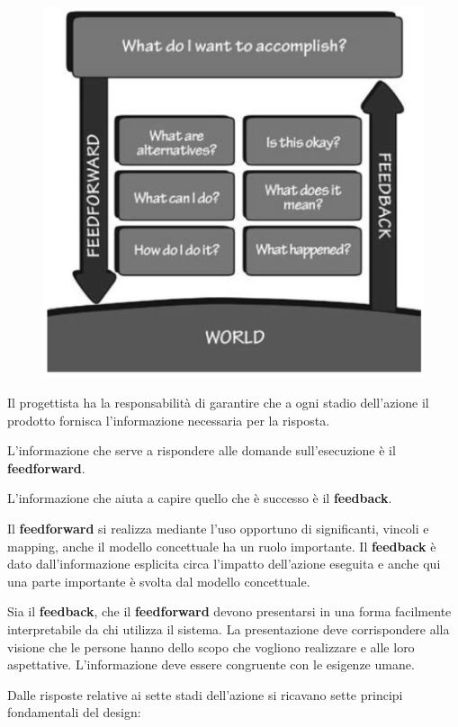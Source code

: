 \documentclass[a4paper,11pt,oneside]{book}
\begin{document}
\begin{figure}[!h]
	\centering
	\includegraphics[scale=0.55]{"immagini/Sette Domande"}
\end{figure}

\pagebreak

Il progettista ha la responsabilità di garantire che a ogni stadio dell'azione il prodotto fornisca l'informazione necessaria per la risposta.

L'informazione che serve a rispondere alle domande sull'esecuzione è il \textbf{feedforward}.

L'informazione che aiuta a capire quello che è successo è il \textbf{feedback}.

Il \textbf{feedforward} si realizza mediante l'uso opportuno di significanti, vincoli e mapping, anche il modello concettuale ha un ruolo importante. Il \textbf{feedback} è dato dall'informazione esplicita circa l'impatto dell'azione eseguita e anche qui una parte importante è svolta dal modello concettuale.

Sia il \textbf{feedback}, che il \textbf{feedforward} devono presentarsi in una forma facilmente interpretabile da chi utilizza il sistema. La presentazione deve corrispondere alla visione che le persone hanno dello scopo che vogliono realizzare e alle loro aspettative. L'informazione deve essere congruente con le esigenze umane.

Dalle risposte relative ai sette stadi dell'azione si ricavano sette principi fondamentali del design:
\end{document}

